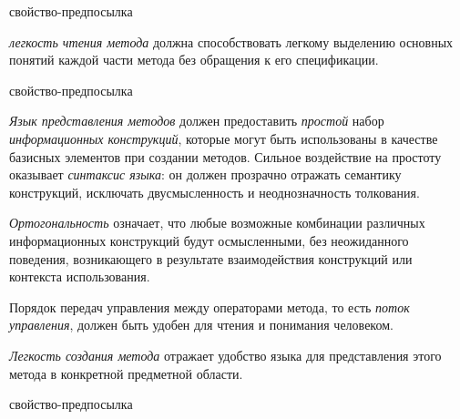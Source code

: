 \begin{SCn}
\begin{scnrelfromlist}{свойство-предпосылка}
\end{scnrelfromlist}
\end{SCn}

\textit{легкость чтения метода} должна способствовать легкому выделению основных понятий каждой части метода без обращения к его спецификации.

\begin{SCn}
\begin{scnrelfromlist}{свойство-предпосылка}
\end{scnrelfromlist}
\end{SCn}

\textit{Язык представления методов} должен предоставить \textit{простой} набор \textit{информационных конструкций}, которые могут быть использованы в качестве базисных элементов при создании методов.
Сильное воздействие на простоту оказывает \textit{синтаксис языка}: он должен прозрачно отражать семантику конструкций, исключать двусмысленность и неоднозначность толкования.

\textit{Ортогональность} означает, что любые возможные комбинации различных информационных конструкций будут осмысленными, без неожиданного поведения, возникающего в результате взаимодействия конструкций или контекста использования.

Порядок передач управления между операторами метода, то есть \textit{поток управления}, должен быть удобен для чтения и понимания человеком.

\textit{Легкость создания метода} отражает удобство языка для представления этого метода в конкретной предметной области.

\begin{SCn}
\begin{scnrelfromlist}{свойство-предпосылка}
\end{scnrelfromlist}
\end{SCn}

